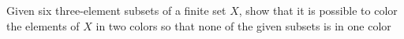 Given six three-element subsets of a finite set $X$, show that it is possible to color the elements of $X$ in two colors so that none of the given subsets is in one color